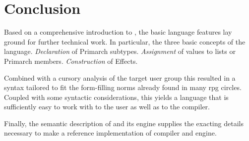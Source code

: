 \section{Conclusion}

Based on a comprehensive introduction to \langname{}, the basic language features lay ground for further technical work. In particular, the three basic concepts of the language. \emph{Declaration} of Primarch subtypes. \emph{Assignment} of values to lists or Primarch members. \emph{Construction} of Effects.

Combined with a cursory analysis of the target user group this resulted in a syntax tailored to fit the form-filling norms already found in many \ac{rpg} circles. Coupled with some syntactic considerations, this yields a language that is sufficiently easy to work with to the user as well as to the compiler.

Finally, the semantic description of \langname{} and its engine supplies the exacting details necessary to make a reference implementation of compiler and engine.
